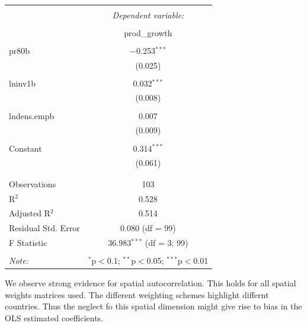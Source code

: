 \documentclass[
  a4paper,
]{article}
\begin{document}
\begin{table}[!htbp] \centering 
  \caption{} 
  \label{} 
\begin{tabular}{@{\extracolsep{5pt}}lc} 
\\[-1.8ex]\hline 
\hline \\[-1.8ex] 
 & \multicolumn{1}{c}{\textit{Dependent variable:}} \\ 
\cline{2-2} 
\\[-1.8ex] & prod\_growth \\ 
\hline \\[-1.8ex] 
 pr80b & $-$0.253$^{***}$ \\ 
  & (0.025) \\ 
  & \\ 
 lninv1b & 0.032$^{***}$ \\ 
  & (0.008) \\ 
  & \\ 
 lndens.empb & 0.007 \\ 
  & (0.009) \\ 
  & \\ 
 Constant & 0.314$^{***}$ \\ 
  & (0.061) \\ 
  & \\ 
\hline \\[-1.8ex] 
Observations & 103 \\ 
R$^{2}$ & 0.528 \\ 
Adjusted R$^{2}$ & 0.514 \\ 
Residual Std. Error & 0.080 (df = 99) \\ 
F Statistic & 36.983$^{***}$ (df = 3; 99) \\ 
\hline 
\hline \\[-1.8ex] 
\textit{Note:}  & \multicolumn{1}{r}{$^{*}$p$<$0.1; $^{**}$p$<$0.05; $^{***}$p$<$0.01} \\ 
\end{tabular} 
\end{table}

We observe strong evidence for spatial autocorrelation. This holds for
all spatial weights matrices used. The different weighting schemes
highlight differnt countries. Thus the neglect fo this spatial dimension
might give rise to bias in the OLS estimated coefficients.
\end{document}
